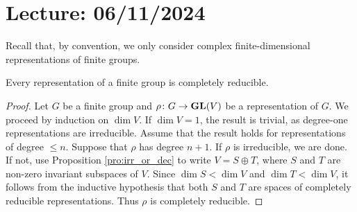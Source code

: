 \section{Lecture: 06/11/2024}
\label{7}

Recall that, by convention, we only consider complex 
finite-dimensional representations of finite groups.

\begin{theorem}[Maschke]
    Every representation of a finite group is completely reducible.
\end{theorem}

\begin{proof}
    Let $G$ be a finite group and $\rho\colon G\to\mathbf{GL}(V)$ be a representation of $G$. We proceed
    by induction on $\dim V$.
    If $\dim V=1$, the result is trivial, as degree-one representations are irreducible. Assume that
    the result holds for representations of degree $\leq n$. Suppose that $\rho$ has degree $n+1$. 
    If $\rho$ is irreducible, we are done. If not, use 
    Proposition \ref{pro:irr_or_dec} to 
    write $V=S\oplus T$, where $S$ and $T$
    are non-zero invariant subspaces of $V$. Since $\dim S<\dim V$ and $\dim T<\dim V$, it follows from
    the inductive hypothesis that
    both $S$ and $T$ are spaces of completely reducible representations. 
    Thus $\rho$ is completely reducible.
\end{proof}

